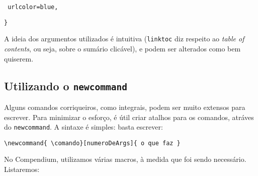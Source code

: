 \documentclass[12pt,a4paper]{article}
\begin{document}
\texttt{    urlcolor=blue,}
    
\texttt{\}}

A ideia dos argumentos utilizados é intuitiva (\texttt{linktoc} diz respeito ao \textit{table of contents}, ou seja, sobre o sumário clicável), e podem ser alterados como bem quiserem.

\newpage
\subsection{Utilizando o \texttt{newcommand}}

Alguns comandos corriqueiros, como integrais, podem ser muito extensos para escrever. Para minimizar o esforço, é útil criar atalhos para os comandos, atráves do \texttt{newcommand}. A sintaxe é simples: basta escrever:

\texttt{\textbackslash newcommand\{ \textbackslash comando\}[numeroDeArgs]\{ o que faz \}}

No Compendium, utilizamos várias macros, à medida que foi sendo necessário. Listaremos:
\end{document}
